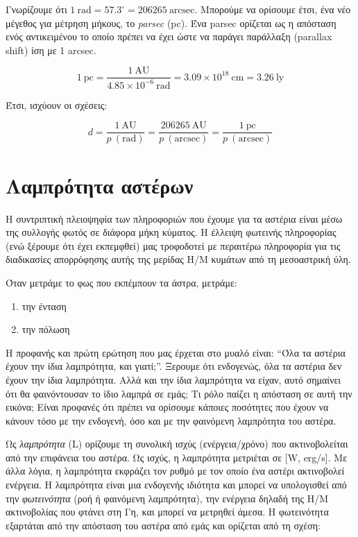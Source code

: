 Γνωρίζουμε ότι $1 \ \text{rad} = 57.3^{\circ} = 206265 \ \text{arcsec}$. Μπορούμε να ορίσουμε έτσι, ένα νέο μέγεθος για μέτρηση μήκους, το \textit{parsec} (pc). Ένα parsec ορίζεται ως η απόσταση ενός αντικειμένου το οποίο πρέπει να έχει ώστε να παράγει παράλλαξη (parallax shift) ίση με 1 arcsec.

\begin{equation}
    1 \ \text{pc} = \frac{1 \ \text{AU}}{4.85 \times 10^{-6} \ \text{rad}} = 3.09 \times 10^{18} \ \text{cm} = 3.26 \ \text{ly}
\end{equation}

Έτσι, ισχύουν οι σχέσεις:

\begin{equation}
    d = \frac{1 \ \text{AU}}{p \ (\text{rad})} = \frac{206265 \ \text{AU}}{p \ (\text{arcsec})} = \frac{1 \ \text{pc}}{p \ (\text{arcsec})}
\end{equation}





\section{Λαμπρότητα αστέρων}

Η συντριπτική πλειοψηφία των πληροφοριών που έχουμε για τα αστέρια είναι μέσω της συλλογής φωτός σε διάφορα μήκη κύματος. Η έλλειψη φωτεινής πληροφορίας (ενώ ξέρουμε ότι έχει εκπεμφθεί) μας τροφοδοτεί με περαιτέρω πληροφορία για τις διαδικασίες απορρόφησης αυτής της μερίδας Η/Μ κυμάτων από τη μεσοαστρική ύλη.

Όταν μετράμε το φως που εκπέμπουν τα άστρα, μετράμε:
\begin{enumerate}
    \item την ένταση
    \item την πόλωση
\end{enumerate}

Η προφανής και πρώτη ερώτηση που μας έρχεται στο μυαλό είναι:
``Όλα τα αστέρια έχουν την ίδια λαμπρότητα, και γιατί;''. Ξερουμε ότι ενδογενώς, όλα τα αστέρια δεν έχουν την ίδια λαμπρότητα. Αλλά και την ίδια λαμπρότητα να είχαν, αυτό σημαίνει ότι θα φαινόντουσαν το ίδιο λαμπρά σε εμάς; Τι ρόλο παίζει η απόσταση σε αυτή την εικόνα; Είναι προφανές ότι πρέπει να ορίσουμε κάποιες ποσότητες που έχουν να κάνουν τόσο με την ενδογενή, όσο και με την φαινόμενη λαμπρότητα του αστέρα.

Ως \textit{λαμπρότητα} (L) ορίζουμε τη συνολική ισχύς (ενέργεια/χρόνο) που ακτινοβολείται από την επιφάνεια του αστέρα. Ως ισχύς, η λαμπρότητα μετριέται σε [W, erg/s]. Με άλλα λόγια, η λαμπρότητα εκφράζει τον ρυθμό με τον οποίο ένα αστέρι ακτινοβολεί ενέργεια. Η λαμπρότητα είναι μια ενδογενής ιδιότητα και μπορεί να υπολογισθεί από την \textit{φωτεινότητα} (ροή ή φαινόμενη λαμπρότητα), την ενέργεια δηλαδή της Η/Μ ακτινοβολίας που φτάνει στη Γη, και μπορεί να μετρηθεί άμεσα. Η φωτεινότητα εξαρτάται από την απόσταση του αστέρα από εμάς και ορίζεται από τη σχέση:

